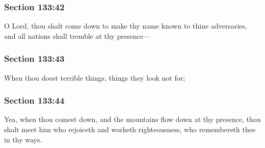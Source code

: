 	\subsubsection{Section 133:42} %
		\label{DC133-42}

		O Lord, thou shalt come down to make thy name known to thine adversaries, and all nations shall tremble at thy presence---


	\subsubsection{Section 133:43} %
		\label{DC133-43}

		When thou doest terrible things, things they look not for;


	\subsubsection{Section 133:44} %
		\label{DC133-44}

		Yea, when thou comest down, and the mountains flow down at thy presence, thou shalt meet him who rejoiceth and worketh righteousness, who remembereth thee in thy ways.


